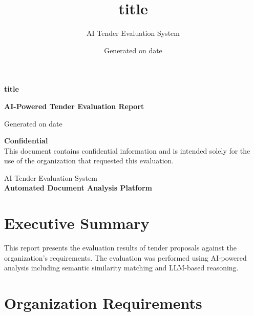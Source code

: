 \documentclass[12pt,a4paper]{article}
\title{\textbf{\textcolor{primary}{ {{ title }} }}}
\date{Generated on {{ date }}}
\author{AI Tender Evaluation System}
\begin{document}
\begin{titlepage}
\centering
\vspace*{2cm}

{\Huge \textbf{\textcolor{primary}{ {{ title }} }}}\\[1cm]

\vspace{2cm}

{\Large \textbf{AI-Powered Tender Evaluation Report}}\\[0.5cm]

\vspace{2cm}

{\large Generated on {{ date }}}\\[0.5cm]

\vspace{3cm}

\textbf{Confidential}\\
This document contains confidential information and is intended solely for the use of the organization that requested this evaluation.

\vfill

{\large AI Tender Evaluation System}\\
\textbf{Automated Document Analysis Platform}

\end{titlepage}

\tableofcontents
\newpage

\section*{Executive Summary}
This report presents the evaluation results of tender proposals against the organization's requirements. The evaluation was performed using AI-powered analysis including semantic similarity matching and LLM-based reasoning.

\section*{Organization Requirements}
\end{document}

